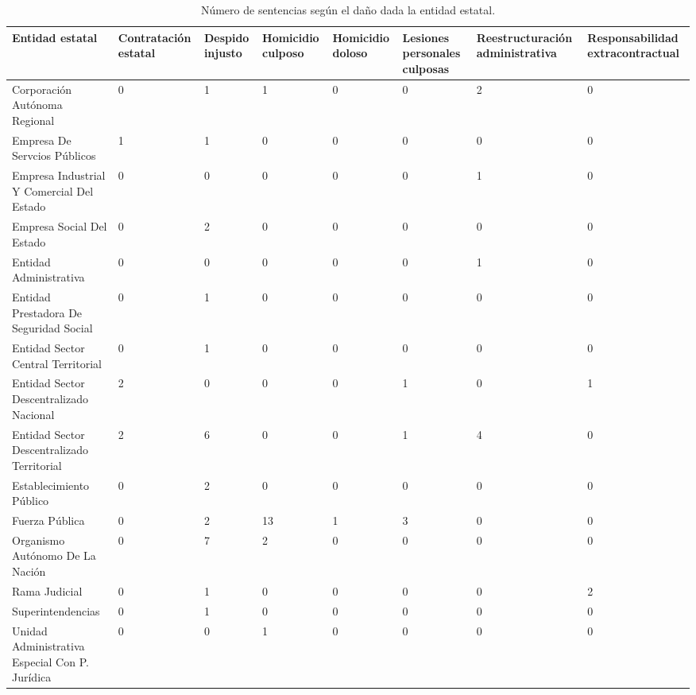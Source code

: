 \begin{sidewaystable}[!htbp]
\centering
\caption{Número de sentencias según el daño dada la entidad estatal.} 
\label{tab:entidaddano}
\begin{tabular}{p{5cm}R{2cm}R{2cm}R{2cm}R{2cm}R{2cm}R{2cm}R{2cm}}
  \hline
Entidad estatal & Contratación estatal & Despido injusto & Homicidio culposo & Homicidio doloso & Lesiones personales culposas & Reestructuración administrativa & Responsabilidad extracontractual \\ 
  \hline
Corporación Autónoma Regional &  0 &  1 &  1 &  0 &  0 &  2 &  0 \\ 
  Empresa De Servcios Públicos &  1 &  1 &  0 &  0 &  0 &  0 &  0 \\ 
  Empresa Industrial Y Comercial Del Estado &  0 &  0 &  0 &  0 &  0 &  1 &  0 \\ 
  Empresa Social Del Estado &  0 &  2 &  0 &  0 &  0 &  0 &  0 \\ 
  Entidad Administrativa &  0 &  0 &  0 &  0 &  0 &  1 &  0 \\ 
  Entidad Prestadora De Seguridad Social &  0 &  1 &  0 &  0 &  0 &  0 &  0 \\ 
  Entidad Sector Central Territorial &  0 &  1 &  0 &  0 &  0 &  0 &  0 \\ 
  Entidad Sector Descentralizado Nacional &  2 &  0 &  0 &  0 &  1 &  0 &  1 \\ 
  Entidad Sector Descentralizado Territorial &  2 &  6 &  0 &  0 &  1 &  4 &  0 \\ 
  Establecimiento Público &  0 &  2 &  0 &  0 &  0 &  0 &  0 \\ 
  Fuerza Pública &  0 &  2 & 13 &  1 &  3 &  0 &  0 \\ 
  Organismo Autónomo De La Nación &  0 &  7 &  2 &  0 &  0 &  0 &  0 \\ 
  Rama Judicial &  0 &  1 &  0 &  0 &  0 &  0 &  2 \\ 
  Superintendencias &  0 &  1 &  0 &  0 &  0 &  0 &  0 \\ 
  Unidad Administrativa Especial Con P. Jurídica &  0 &  0 &  1 &  0 &  0 &  0 &  0 \\ 
   \hline
\end{tabular}
\end{sidewaystable}
